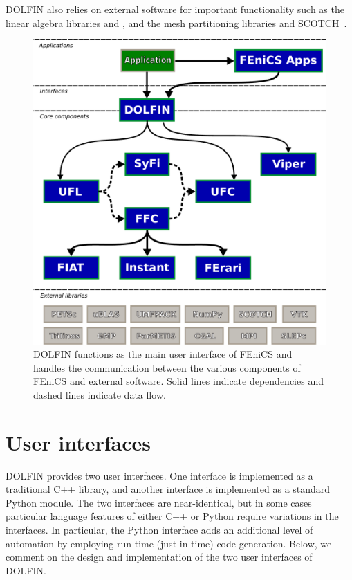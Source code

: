 DOLFIN also relies on external software for important functionality
such as the linear algebra libraries
\citet{www:petsc,www:trilinos,www:ublas} and \citet{www:mtl4}, and the
mesh partitioning libraries \citet{www:parmetis} and
SCOTCH~\citep{www:scotch}.
\begin{figure}
  \centering
  \includegraphics[width=\largefig]{chapters/logg-2/pdf/fenics-map.pdf}
  \caption{DOLFIN functions as the main user interface of FEniCS and
    handles the communication between the various components of FEniCS
    and external \hbox{software.} Solid lines indicate dependencies and
    dashed lines indicate data flow.}
  \label{fig:logg-2:fenicsmap}
\end{figure}

\section{User interfaces}

DOLFIN provides two user interfaces. One interface is implemented as a
traditional C++ library, and another interface is implemented as a
standard Python module. The two interfaces are near-identical, but in
some cases particular language features of either C++ or Python
require variations in the interfaces.  In particular, the Python
interface adds an additional level of automation by employing
run-time (just-in-time) code generation.  Below, we comment on the
design and implementation of the two user interfaces of DOLFIN.

